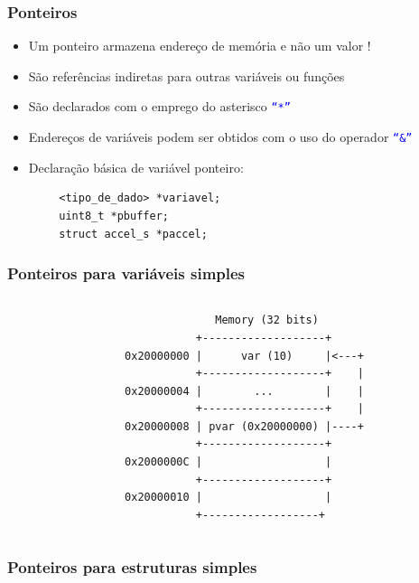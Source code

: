 \documentclass{beamer}
\begin{document}
\begin{frame}[fragile]
	\frametitle{Ponteiros}
	\begin{itemize}
		\item Um ponteiro armazena endereço de memória e não um valor !
		\item São referências indiretas para outras variáveis ou funções
		\item São declarados com o emprego do asterisco \texttt{\textcolor{blue}{``*''}}
		\item Endereços de variáveis podem ser obtidos com o uso do operador \texttt{\textcolor{blue}{``\&''}}
		\item Declaração básica de variável ponteiro:
	\end{itemize}
	\begin{verbatim}
        <tipo_de_dado> *variavel;
        uint8_t *pbuffer;
        struct accel_s *paccel;
	\end{verbatim}
\end{frame}
%
%
\begin{frame}[fragile]
	\frametitle{Ponteiros para variáveis simples}
	\begin{columns}[T] %
	\begin{column}{.50\textwidth}
		
	\end{column}%
	\hfill%
	\begin{column}{.50\textwidth}
	 {\tiny
	\begin{verbatim}
              Memory (32 bits)
           +-------------------+
0x20000000 |      var (10)     |<---+
           +-------------------+    |
0x20000004 |        ...        |    |
           +-------------------+    |
0x20000008 | pvar (0x20000000) |----+
           +-------------------+
0x2000000C |                   |
           +-------------------+
0x20000010 |                   |
           +------------------+
	\end{verbatim}
}

	\end{column}%
\end{columns}
\end{frame}

\begin{frame}[fragile]
	\frametitle{Ponteiros para estruturas simples}
	\begin{columns}[T] %
	\begin{column}{.75\textwidth}
		
	\end{column}%
	\hfill%
	\begin{column}{.25\textwidth}
	\end{column}%
\end{columns}
\end{frame}
\end{document}
